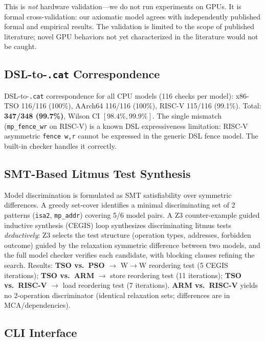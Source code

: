 \documentclass[11pt]{article}
\begin{document}
This is \emph{not} hardware validation---we do not run experiments on
GPUs. It is formal cross-validation: our axiomatic model agrees with
independently published formal and empirical results. The validation
is limited to the scope of published literature; novel GPU behaviors
not yet characterized in the literature would not be caught.

\subsection{DSL-to-\texttt{.cat} Correspondence}
\label{sec:dsl-cat}

DSL-to-\texttt{.cat} correspondence for all CPU models (116 checks per model):
x86-TSO 116/116 (100\%), AArch64 116/116 (100\%), RISC-V 115/116 (99.1\%).
Total: \textbf{347/348 (99.7\%)}, Wilson CI $[98.4\%, 99.9\%]$.
The single mismatch (\texttt{mp\_fence\_wr} on RISC-V) is a known
DSL expressiveness limitation: RISC-V asymmetric \texttt{fence w,r}
cannot be expressed in the generic DSL fence model. The built-in
checker handles it correctly.

\subsection{SMT-Based Litmus Test Synthesis}
\label{sec:synthesis}

Model discrimination is formulated as SMT satisfiability over
symmetric differences. A greedy set-cover identifies a minimal
discriminating set of 2 patterns (\texttt{isa2}, \texttt{mp\_addr})
covering 5/6 model pairs.
A Z3 counter-example guided inductive synthesis (CEGIS) loop
synthesizes discriminating litmus tests \emph{deductively}: Z3
selects the test structure (operation types, addresses, forbidden
outcome) guided by the relaxation symmetric difference between
two models, and the full model checker verifies each candidate,
with blocking clauses refining the search.
Results: \textbf{TSO vs.\ PSO} $\to$ W$\to$W reordering test
(5 CEGIS iterations); \textbf{TSO vs.\ ARM} $\to$ store
reordering test (11 iterations); \textbf{TSO vs.\ RISC-V} $\to$
load reordering test (7 iterations).
\textbf{ARM vs.\ RISC-V} yields no 2-operation discriminator
(identical relaxation sets; differences are in MCA/dependencies).

\subsection{CLI Interface}
\label{sec:cicd-results}
\end{document}
